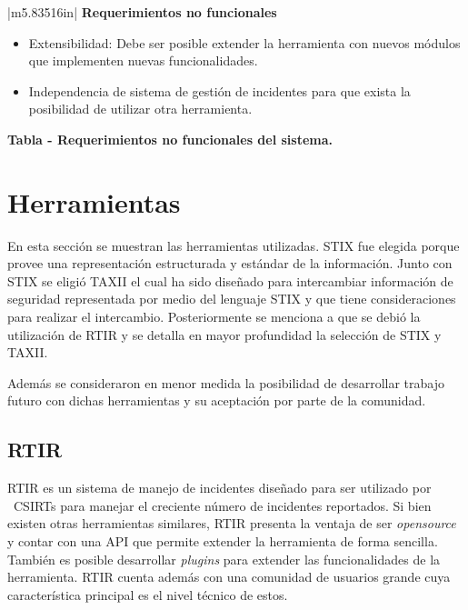 \documentclass[11pt]{article}
\makeatletter
\newcommand\arraybslash{\let\\\@arraycr}
\newcounter{Tabla}
\renewcommand\theTabla{\arabic{Tabla}}
\makeatother
\begin{document}
\begin{flushleft}
\tablefirsthead{}
\tablehead{}
\tabletail{}
\tablelasttail{}
\begin{supertabular}{|m{5.83516in}|}
\hline
\centering\arraybslash{\bfseries Requerimientos no funcionales}\\\hline
\begin{itemize}
\item { Extensibilidad: Debe ser posible extender la herramienta con nuevos módulos que
implementen nuevas funcionalidades.}
\item { Independencia de sistema de gestión de incidentes para que exista la posibilidad de
utilizar otra herramienta.}
\end{itemize}
\\\hline
\end{supertabular}
\end{flushleft}
{\centering{}\bfseries
\foreignlanguage{spanish}{Tabla }\stepcounter{Tabla}{\theTabla}\foreignlanguage{spanish}{ - Requerimientos no
funcionales del sistema.}
\par}


\bigskip

\section{Herramientas}
{
En esta sección se muestran las herramientas utilizadas. STIX fue elegida porque provee una representación estructurada
y estándar de la información. Junto con STIX se eligió TAXII el cual ha sido diseñado para intercambiar información de
seguridad representada por medio del lenguaje STIX y que tiene consideraciones para realizar el intercambio.
Posteriormente se menciona a que se debió la utilización de RTIR y se detalla en mayor profundidad la selección de STIX
y TAXII.}

{
Además se consideraron en menor medida la posibilidad de desarrollar trabajo futuro con dichas herramientas y su
aceptación por parte de la comunidad.}


\bigskip

\subsection{RTIR}

\bigskip

{
RTIR es un sistema de manejo de incidentes diseñado para ser utilizado por \ CSIRTs para manejar el creciente número de
incidentes reportados. Si bien existen otras herramientas similares, RTIR presenta la ventaja de ser
\textit{opensource} y contar con una API que permite extender la herramienta de forma sencilla. También es posible
desarrollar \textit{plugins} para extender las funcionalidades de la herramienta. RTIR cuenta además con una comunidad
de usuarios grande cuya característica principal es el nivel técnico de estos.}
\end{document}
